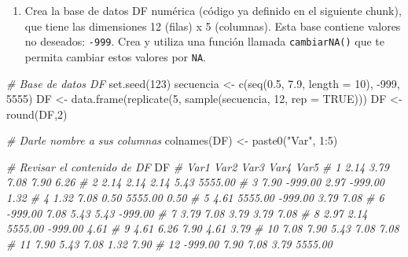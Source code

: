 \documentclass[
]{article}
\newenvironment{Shaded}{\begin{snugshade}}{\end{snugshade}}
\newcommand{\AttributeTok}[1]{\textcolor[rgb]{0.77,0.63,0.00}{#1}}
\newcommand{\CommentTok}[1]{\textcolor[rgb]{0.56,0.35,0.01}{\textit{#1}}}
\newcommand{\ConstantTok}[1]{\textcolor[rgb]{0.00,0.00,0.00}{#1}}
\newcommand{\DecValTok}[1]{\textcolor[rgb]{0.00,0.00,0.81}{#1}}
\newcommand{\FloatTok}[1]{\textcolor[rgb]{0.00,0.00,0.81}{#1}}
\newcommand{\FunctionTok}[1]{\textcolor[rgb]{0.00,0.00,0.00}{#1}}
\newcommand{\NormalTok}[1]{#1}
\newcommand{\OtherTok}[1]{\textcolor[rgb]{0.56,0.35,0.01}{#1}}
\newcommand{\SpecialCharTok}[1]{\textcolor[rgb]{0.00,0.00,0.00}{#1}}
\newcommand{\StringTok}[1]{\textcolor[rgb]{0.31,0.60,0.02}{#1}}
\providecommand{\tightlist}{%
  \setlength{\itemsep}{0pt}\setlength{\parskip}{0pt}}
\theoremstyle{definition}
\theoremstyle{definition}
\theoremstyle{definition}
\theoremstyle{definition}
\theoremstyle{remark}
\begin{document}
\begin{enumerate}
\def\labelenumi{\arabic{enumi}.}
\tightlist
\item
  Crea la base de datos DF numérica (código ya definido en el siguiente chunk), que tiene las dimensiones 12 (filas) x 5 (columnas). Esta base contiene valores no deseados: \texttt{-999}. Crea y utiliza una función llamada \texttt{cambiarNA()} que te permita cambiar estos valores por \texttt{NA}.
\end{enumerate}

\begin{Shaded}
\begin{Highlighting}[]
\CommentTok{\# Base de datos DF}
\FunctionTok{set.seed}\NormalTok{(}\DecValTok{123}\NormalTok{)}
\NormalTok{secuencia }\OtherTok{\textless{}{-}} \FunctionTok{c}\NormalTok{(}\FunctionTok{seq}\NormalTok{(}\FloatTok{0.5}\NormalTok{, }\FloatTok{7.9}\NormalTok{, }\AttributeTok{length =} \DecValTok{10}\NormalTok{), }\SpecialCharTok{{-}}\DecValTok{999}\NormalTok{, }\DecValTok{5555}\NormalTok{)}
\NormalTok{DF }\OtherTok{\textless{}{-}} \FunctionTok{data.frame}\NormalTok{(}\FunctionTok{replicate}\NormalTok{(}\DecValTok{5}\NormalTok{, }
                           \FunctionTok{sample}\NormalTok{(secuencia, }\DecValTok{12}\NormalTok{, }\AttributeTok{rep =} \ConstantTok{TRUE}\NormalTok{)))}
\NormalTok{DF }\OtherTok{\textless{}{-}} \FunctionTok{round}\NormalTok{(DF,}\DecValTok{2}\NormalTok{)}

\CommentTok{\# Darle nombre a sus columnas}
\FunctionTok{colnames}\NormalTok{(DF) }\OtherTok{\textless{}{-}} \FunctionTok{paste0}\NormalTok{(}\StringTok{"Var"}\NormalTok{, }\DecValTok{1}\SpecialCharTok{:}\DecValTok{5}\NormalTok{)}

\CommentTok{\# Revisar el contenido de DF}
\NormalTok{DF }
\CommentTok{\#       Var1    Var2    Var3    Var4    Var5}
\CommentTok{\# 1     2.14    3.79    7.08    7.90    6.26}
\CommentTok{\# 2     2.14    2.14    2.14    5.43 5555.00}
\CommentTok{\# 3     7.90 {-}999.00    2.97 {-}999.00    1.32}
\CommentTok{\# 4     1.32    7.08    0.50 5555.00    0.50}
\CommentTok{\# 5     4.61 5555.00 {-}999.00    3.79    7.08}
\CommentTok{\# 6  {-}999.00    7.08    5.43    5.43 {-}999.00}
\CommentTok{\# 7     3.79    7.08    3.79    3.79    7.08}
\CommentTok{\# 8     2.97    2.14 5555.00 {-}999.00    4.61}
\CommentTok{\# 9     4.61    6.26    7.90    4.61    3.79}
\CommentTok{\# 10    7.08    7.90    5.43    7.08    7.08}
\CommentTok{\# 11    7.90    5.43    7.08    1.32    7.90}
\CommentTok{\# 12 {-}999.00    7.90    7.08    3.79 5555.00}
\end{Highlighting}
\end{Shaded}
\end{document}
